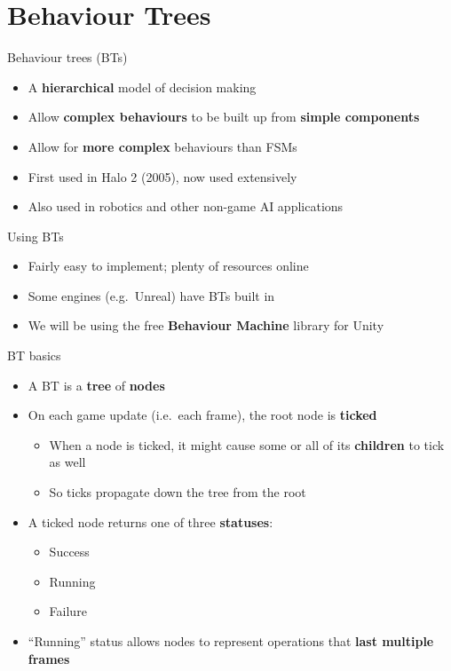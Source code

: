 \part{Behaviour Trees}
\frame{\partpage}

\begin{frame}{Behaviour trees (BTs)}
	\begin{itemize}
		\pause\item A \textbf{hierarchical} model of decision making
		\pause\item Allow \textbf{complex behaviours} to be built up from \textbf{simple components}
		\pause\item Allow for \textbf{more complex} behaviours than FSMs
		\pause\item First used in Halo 2 (2005), now used extensively
		\pause\item Also used in robotics and other non-game AI applications
	\end{itemize}
\end{frame}

\begin{frame}{Using BTs}
	\begin{itemize}
		\pause\item Fairly easy to implement; plenty of resources online
		\pause\item Some engines (e.g.\ Unreal) have BTs built in
		\pause\item We will be using the free \textbf{Behaviour Machine} library for Unity
	\end{itemize}
\end{frame}

\begin{frame}{BT basics}
	\begin{itemize}
		\pause\item A BT is a \textbf{tree} of \textbf{nodes}
		\pause\item On each game update (i.e.\ each frame), the root node is \textbf{ticked}
			\begin{itemize}
				\pause\item When a node is ticked, it might cause some or all of its \textbf{children} to tick as well
				\pause\item So ticks propagate down the tree from the root
			\end{itemize}
		\pause\item A ticked node returns one of three \textbf{statuses}:
			\begin{itemize}
				\pause\item Success
				\pause\item Running
				\pause\item Failure
			\end{itemize}
		\pause\item ``Running'' status allows nodes to represent operations that \textbf{last multiple frames}
	\end{itemize}
\end{frame}

